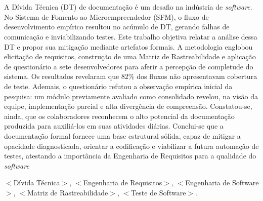 \section*{} 
\noindent A Dívida Técnica (DT) de documentação é um desafio na indústria de \textit{software}. No Sistema de Fomento ao Microempreendedor (SFM), o fluxo de desenvolvimento empírico resultou no acúmulo de DT, gerando falhas de comunicação e inviabilizando testes. Este trabalho objetiva relatar a análise dessa DT e propor sua mitigação mediante artefatos formais. A metodologia englobou elicitação de requisitos, construção de uma Matriz de Rastreabilidade e aplicação de questionário a sete desenvolvedores para aferir a percepção de completude do sistema. Os resultados revelaram que 82\% dos fluxos não apresentavam cobertura de teste. Ademais, o questionário refutou a observação empírica inicial da pesquisa: um módulo previamente avaliado como consolidado revelou, na visão da equipe, implementação parcial e alta divergência de compreensão. Constatou-se, ainda, que os colaboradores reconhecem o alto potencial da documentação produzida para auxiliá-los em suas atividades diárias. Conclui-se que a documentação formal fornece uma base estrutural sólida, capaz de mitigar a opacidade diagnosticada, orientar a codificação e viabilizar a futura automação de testes, atestando a importância da Engenharia de Requisitos para a qualidade do \textit{software}

 $<$Dívida Técnica$>$, $<$Engenharia de Requisitos$>$, $<$Engenharia de Software$>$, $<$Matriz de Rastreabilidade$>$, $<$Teste de Software$>$.
